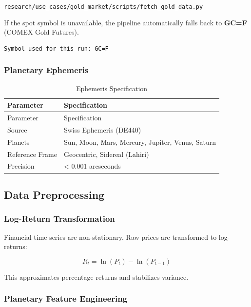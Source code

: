 \documentclass[
  11pt,
  a4paper,
  oneside,
  openany]{article}
\begin{document}
\texttt{research/use\_cases/gold\_market/scripts/fetch\_gold\_data.py}

If the spot symbol is unavailable, the pipeline automatically falls back
to \textbf{GC=F} (COMEX Gold Futures).

\label{gold-symbol-used}
\begin{verbatim}
Symbol used for this run: GC=F
\end{verbatim}

\subsubsection{Planetary Ephemeris}\label{planetary-ephemeris}

\begin{longtable}[]{@{}ll@{}}
\caption{Ephemeris Specification}\label{tbl-ephemeris}\tabularnewline
\toprule\noalign{}
Parameter & Specification \\
\midrule\noalign{}
\endfirsthead
\toprule\noalign{}
Parameter & Specification \\
\midrule\noalign{}
\endhead
\bottomrule\noalign{}
\endlastfoot
Source & Swiss Ephemeris (DE440) \\
Planets & Sun, Moon, Mars, Mercury, Jupiter, Venus, Saturn \\
Reference Frame & Geocentric, Sidereal (Lahiri) \\
Precision & \textless{} 0.001 arcseconds \\
\end{longtable}

\subsection{Data Preprocessing}\label{data-preprocessing}

\subsubsection{Log-Return
Transformation}\label{log-return-transformation}

Financial time series are non-stationary. Raw prices are transformed to
log-returns:

\[
R_t = \ln(P_t) - \ln(P_{t-1})
\]

This approximates percentage returns and stabilizes variance.

\subsubsection{Planetary Feature
Engineering}\label{planetary-feature-engineering}
\end{document}
